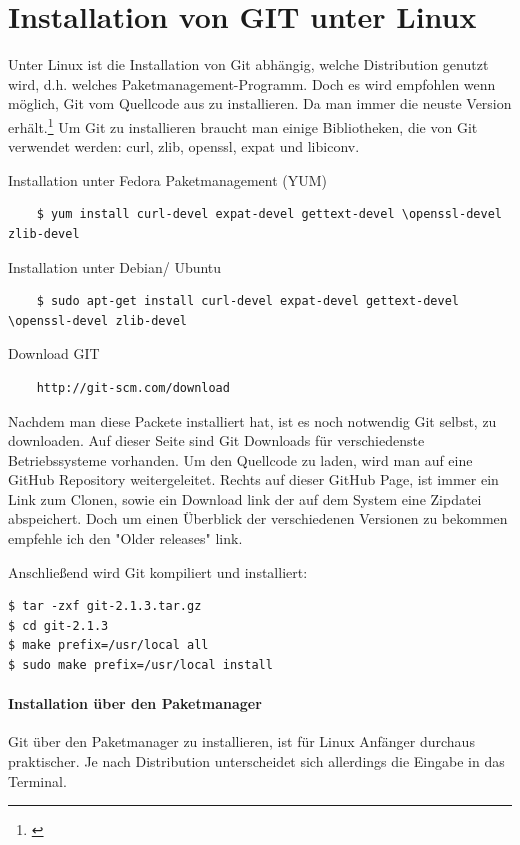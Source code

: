 \documentclass[12pt,a4paper,bibliography=totocnumbered,listof=totocnumbered]{scrartcl}
\begin{document}
\section{Installation von GIT unter Linux}
Unter Linux ist die Installation von Git abhängig, welche Distribution genutzt wird, d.h. welches Paketmanagement-Programm. Doch es wird empfohlen wenn möglich, Git vom Quellcode aus zu installieren. Da man immer die neuste Version erhält.\footnote{\cite{chacon2009pro}} Um Git zu installieren braucht man einige Bibliotheken, die von Git verwendet werden: curl, zlib, openssl, expat und libiconv. 

Installation unter Fedora Paketmanagement (YUM)
\begin{lstlisting}
	$ yum install curl-devel expat-devel gettext-devel \openssl-devel zlib-devel
 \end{lstlisting}

Installation unter Debian/ Ubuntu
\begin{lstlisting}
	$ sudo apt-get install curl-devel expat-devel gettext-devel \openssl-devel zlib-devel
 \end{lstlisting}
 
Download GIT

\begin{lstlisting}
	http://git-scm.com/download
 \end{lstlisting}
 
 
Nachdem man diese Packete installiert hat, ist es noch notwendig Git selbst, zu downloaden. Auf dieser Seite sind Git Downloads für verschiedenste Betriebssysteme vorhanden. Um den Quellcode zu laden, wird man auf eine GitHub Repository weitergeleitet. Rechts auf dieser GitHub Page, ist immer ein Link zum Clonen, sowie ein Download link der auf dem System eine Zipdatei abspeichert. Doch um einen Überblick der verschiedenen Versionen zu bekommen 
empfehle ich den "Older releases"  link.

Anschließend wird Git kompiliert und installiert:
\begin{lstlisting}
$ tar -zxf git-2.1.3.tar.gz
$ cd git-2.1.3
$ make prefix=/usr/local all
$ sudo make prefix=/usr/local install
 \end{lstlisting}

\paragraph{Installation über den Paketmanager}

Git über den Paketmanager zu installieren, ist für Linux Anfänger durchaus praktischer. Je nach Distribution unterscheidet sich allerdings die Eingabe in das Terminal.
\end{document}
